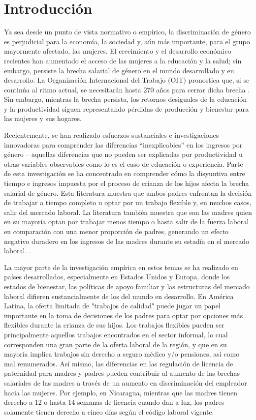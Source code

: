 
\section{Introducción}

Ya sea desde un punto de vista normativo o empírico, la discriminación de género es perjudicial para la economía, la sociedad y, aún más importante, para el grupo mayormente afectado, las mujeres. El crecimiento y el desarrollo económico recientes han aumentado el acceso de las mujeres a la educación y la salud; sin embargo, persiste la brecha salarial de género en el mundo desarrollado y en desarrollo. La Organización Internacional del Trabajo (OIT) pronostica que, si se continúa al ritmo actual, se necesitarán hasta 270 años para cerrar dicha brecha \citep{ILO2018}. Sin embargo, mientras la brecha persista, los retornos desiguales de la educación y la productividad siguen representando pérdidas de producción y bienestar para las mujeres y sus hogares.

Recientemente, se han realizado esfuerzos sustanciales e investigaciones innovadoras para comprender las diferencias ``inexplicables'' en los ingresos por género – aquellas diferencias que no pueden ser explicadas por productividad u otras variables observables como lo es el caso de educación o experiencia. Parte de esta investigación se ha concentrado en comprender cómo la disyuntiva entre tiempo e ingresos impuesta por el proceso de crianza de los hijos afecta la brecha salarial de género. Esta literatura muestra que ambos padres enfrentan la decisión de trabajar a tiempo completo u optar por un trabajo flexible y, en muchos casos, salir del mercado laboral. La literatura también muestra que son las madres quien en su mayoría optan por trabajar menos tiempo o hasta salir de la fuerza laboral en comparación con una menor proporción de padres, generando un efecto negativo duradero en los ingresos de las madres durante su estadía en el mercado laboral. \citep{Berniell2021,Boca2013,Goldin2014,Kleven2019}. 

La mayor parte de la investigación empírica en estos temas se ha realizado en países desarrollados, especialmente en Estados Unidos y Europa, donde los estados de bienestar, las políticas de apoyo familiar y las estructuras del mercado laboral difieren sustancialmente de los del mundo en desarrollo. En América Latina, la oferta limitada de "trabajos de calidad" puede jugar un papel importante en la toma de decisiones de los padres para optar por opciones más flexibles durante la crianza de sus hijos. Los trabajos flexibles pueden ser principalmente aquellos trabajos encontrados en el sector informal, lo cual corresponden una gran parte de la oferta laboral de la región, y que en su mayoría implica trabajos sin derecho a seguro médico y/o pensiones, así como mal remunerados. Así mismo, las diferencias en las regulación de licencia de paternidad para madres y padres pueden contribuir al aumento de las brechas salariales de las madres a través de un aumento en discriminación del empleador hacia las mujeres. Por ejemplo, en Nicaragua, mientras que las madres tienen derecho a 12 o hasta 14 semanas de licencia cuando dan a luz, los padres solamente tienen derecho a cinco días según el código laboral vigente.

